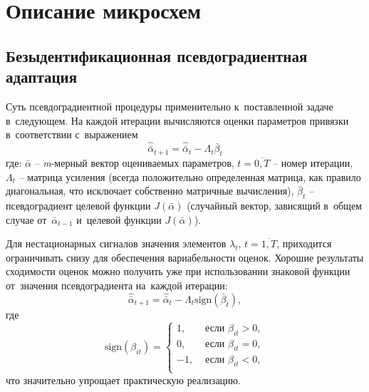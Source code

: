 \chapter{Описание микросхем}
\section{Безыдентификационная псевдоградиентная адаптация}
Суть псевдоградиентной процедуры применительно к~поставленной задаче в~следующем. На каждой итерации вычисляются оценки параметров привязки в~соответствии с~выражением
\[
\hat{\bar{\alpha}}_{t+1}=\hat{\bar{\alpha}}_{t}-\Lambda_{t}\bar{\beta}_{t}
\]
где: $\bar{\alpha}$ -- \textit{m}-мерный вектор оцениваемых параметров, $t=\overline{0,T}$ -- номер итерации, $\Lambda_{t}$ -- матрица усиления (всегда положительно определенная матрица, как правило диагональная, что исключает собственно матричные вычисления), $\bar{\beta}_{t}$ -- псевдоградиент целевой функции $J(\bar{\alpha})$ (случайный вектор, зависящий в~общем случае от~$\bar{\alpha}_{t-1}$ и~целевой функции $J(\bar{\alpha})$).

Для нестационарных сигналов значения элементов $\lambda_{t}$, $t=\overline{1,T}$, приходится ограничивать снизу для обеспечения вариабельности оценок. Хорошие результаты сходимости оценок можно получить уже при использовании знаковой функции от~значения псевдоградиента на~каждой итерации:
\[
\hat{\bar{\alpha}}_{t+1}=\hat{\bar{\alpha}}_{t}-\Lambda_{t}\text{sign}(\bar{\beta}_{t}),
\]
где
\[
\text{sign}(\beta_{it})= 
\left\{
	\begin{aligned}
		1, &\text{ если } \beta_{it} > 0, \\
		0, &\text{ если } \beta_{it} = 0, \\
		-1, &\text{ если } \beta_{it} < 0, \\
	\end{aligned}
\right.
\]
что значительно упрощает практическую реализацию. 